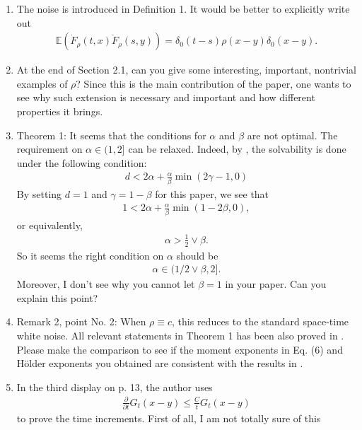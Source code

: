 \documentclass[12pt]{article} %
\newcommand {\E}{\mathbb{E}}
\begin{document}
\begin{enumerate}
	\item The noise is introduced in Definition 1. It would be better to
		explicitly write out
		\begin{align}
			\label{E:F}
			\E\left(\dot{F}_\rho(t,x)\dot{F}_\rho(s,y)\right) =
			\delta_0(t-s)\rho(x-y)\delta_0(x-y).
		\end{align}
	\item At the end of Section 2.1, can you give some interesting, important,
		nontrivial examples of $\rho$? Since this is the main contribution of the
		paper, one wants to see why such extension is necessary and important and
		how different properties it brings.
	\item Theorem 1: It seems that the conditions for $\alpha$ and $\beta$ are not
		optimal. The requirement on $\alpha \in (1,2]$ can be relaxed. Indeed, by
		\cite{CHN19}, the solvability is done under the following condition:
		\begin{align*}
			d < 2\alpha + \frac{\alpha}{\beta} \min\left(2 \gamma -1,0\right)
		\end{align*}
		By setting $d=1$ and  $\gamma=1-\beta$ for this paper, we see that
		\begin{align*}
			1<2\alpha + \frac{\alpha}{\beta}\min\left(1-2\beta,0\right),
		\end{align*}
		or equivalently,
		\begin{align*}
			\alpha > \frac{1}{2} \vee \beta.
		\end{align*}
		So it seems the right condition on $\alpha$ should be
		\begin{align*}
			\alpha \in (1/2\vee \beta, 2].
		\end{align*}
		Moreover, I don't see why you cannot let $\beta=1$ in your paper. Can you
		explain this point?
	\item Remark 2, point No. 2: When $\rho\equiv c$, this reduces to the standard
		space-time white noise. All relevant statements in Theorem 1 has been also
		proved in \cite{CHN19}. Please make the comparison to see if the moment
		exponents in Eq. (6) and H\"older exponents you obtained are consistent
		with the results in \cite{CHN19}.
	\item In the third display on p. 13, the author uses
		\begin{align}
			\label{E:DG}
			\frac{\partial}{\partial t}G_t(x-y) \le \frac{C}{t} G_t(x-y)
		\end{align}
		to prove the time increments. First of all, I am not totally sure of this

\end{enumerate}
\end{document}

